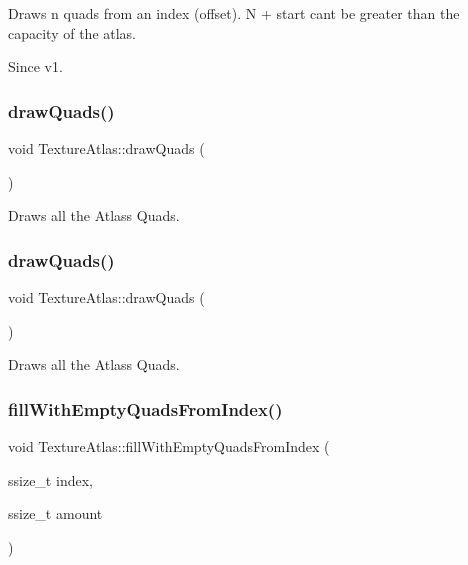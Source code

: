 Draws n quads from an index (offset). N + start can\textquotesingle{}t be greater than the capacity of the atlas.

\begin{DoxySince}{Since}
v1. 
\end{DoxySince}
\mbox{\label{classTextureAtlas_a40a5702b4d87530a78f4e117088d41d6}} 
\subsubsection{\texorpdfstring{draw\+Quads()}{drawQuads()}\hspace{0.1cm}{\footnotesize\ttfamily [1/2]}}
{\footnotesize\ttfamily void Texture\+Atlas\+::draw\+Quads (\begin{DoxyParamCaption}{ }\end{DoxyParamCaption})}

Draws all the Atlas\textquotesingle{}s Quads. \mbox{\label{classTextureAtlas_a40a5702b4d87530a78f4e117088d41d6}} 
\subsubsection{\texorpdfstring{draw\+Quads()}{drawQuads()}\hspace{0.1cm}{\footnotesize\ttfamily [2/2]}}
{\footnotesize\ttfamily void Texture\+Atlas\+::draw\+Quads (\begin{DoxyParamCaption}{ }\end{DoxyParamCaption})}

Draws all the Atlas\textquotesingle{}s Quads. \mbox{\label{classTextureAtlas_ac32f2ddd656d12d187a5ad709c74017b}} 
\subsubsection{\texorpdfstring{fill\+With\+Empty\+Quads\+From\+Index()}{fillWithEmptyQuadsFromIndex()}\hspace{0.1cm}{\footnotesize\ttfamily [1/2]}}
{\footnotesize\ttfamily void Texture\+Atlas\+::fill\+With\+Empty\+Quads\+From\+Index (\begin{DoxyParamCaption}\item[{ssize\+\_\+t}]{index,  }\item[{ssize\+\_\+t}]{amount }\end{DoxyParamCaption})}

